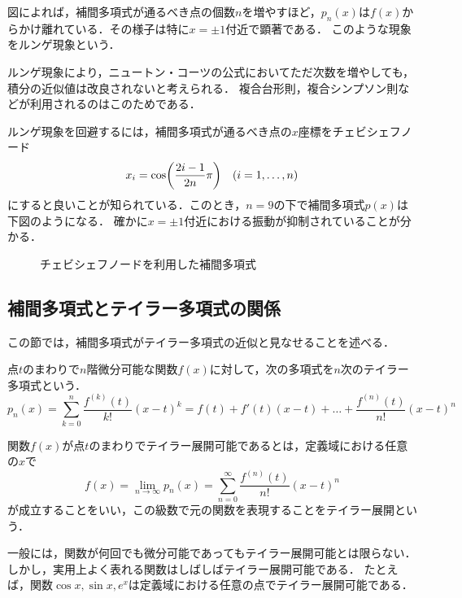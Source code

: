 \documentclass[a4paper]{ltjsarticle}
\theoremstyle{definition}
\DeclarePairedDelimiter{\pqty}{\lparen}{\rparen}
\begin{document}
図によれば，補間多項式が通るべき点の個数$n$を増やすほど，$p_n(x)$は$f(x)$からかけ離れている．その様子は特に$x=\pm 1$付近で顕著である．
このような現象をルンゲ現象という．

ルンゲ現象により，ニュートン・コーツの公式においてただ次数を増やしても，積分の近似値は改良されないと考えられる．
複合台形則，複合シンプソン則などが利用されるのはこのためである．

ルンゲ現象を回避するには，補間多項式が通るべき点の$x$座標をチェビシェフノード
\[
  x_i = \cos\pqty*{\frac{2i-1}{2n} \pi}\quad (i = 1, \dots, n)
\]
にすると良いことが知られている\cite{horinouchi}．このとき，$n=9$の下で補間多項式$p(x)$は下図のようになる．
確かに$x=\pm 1$付近における振動が抑制されていることが分かる．

\begin{figure}[H]
  \centering
  \caption{チェビシェフノードを利用した補間多項式}
\end{figure}

\subsection{補間多項式とテイラー多項式の関係}
この節では，補間多項式がテイラー多項式の近似と見なせることを述べる．

点$t$のまわりで$n$階微分可能な関数$f(x)$に対して，次の多項式を$n$次のテイラー多項式という．
\[
  p_n(x)=\sum_{k=0}^n \frac{f^{(k)}(t)}{k!} (x-t)^k=f(t)+f'(t)(x-t)+\dots+\frac{f^{(n)}(t)}{n!} (x-t)^n
\]

関数$f(x)$が点$t$のまわりでテイラー展開可能であるとは，定義域における任意の$x$で
\[
  f(x)=\lim_{n\to\infty} p_n(x)=\sum_{n=0}^\infty\frac{f^{(n)}(t)}{n!} (x-t)^n
\]
が成立することをいい，この級数で元の関数を表現することをテイラー展開という．

一般には，関数が何回でも微分可能であってもテイラー展開可能とは限らない．しかし，実用上よく表れる関数はしばしばテイラー展開可能である．
たとえば，関数$\cos x,\sin x,e^x$は定義域における任意の点でテイラー展開可能である．
\end{document}
